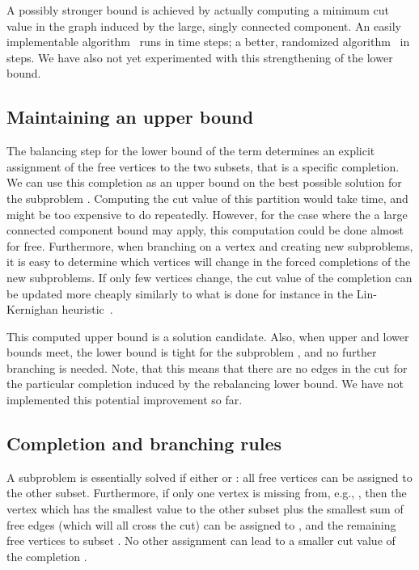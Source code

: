 \documentclass[a4paper,11pt]{article}
\begin{document}
A possibly stronger bound is achieved by actually computing a minimum
cut value in the graph induced by the large, singly connected
component. An easily implementable algorithm~\cite{StoerWagner97} runs
in  time steps; a better, randomized
algorithm~\cite{Karger00} in  steps.  We have also not
yet experimented with this strengthening of the lower bound.

\subsection{Maintaining an upper bound}

The balancing step for the lower bound of the  term determines an explicit
assignment of the free vertices to the two subsets, that is a specific
completion. We can use this completion as an upper bound on the best
possible solution for the subproblem .  Computing the cut
value of this partition would take  time, and might be too
expensive to do repeatedly.  However, for the case where the a large
connected component bound may apply, this computation could be done
almost for free. Furthermore, when branching on a vertex and creating
new subproblems, it is easy to determine which vertices will change in
the forced completions of the new subproblems. If only few vertices
change, the cut value of the completion can be updated more cheaply
similarly to what is done for instance in the Lin-Kernighan
heuristic~\cite{FiducciaMattheyses82,KernighanLin70,Traff06:kpartition}.

This computed upper bound is a solution candidate. Also, when upper and
lower bounds meet, the lower bound is tight for the subproblem
, and no further branching is needed. Note, that this means
that there are no edges in the cut  for the particular completion  induced by the
rebalancing lower bound.  We have not implemented this potential
improvement so far.

\subsection{Completion and branching rules}

A subproblem is essentially solved if either  or
: all free vertices can be assigned to the other subset.
Furthermore, if only one vertex is missing from, e.g., , then the
vertex which has the smallest  value to the other subset plus
the smallest sum of free edges (which will all cross the cut) can be
assigned to , and the remaining free vertices to subset . No
other assignment can lead to a smaller cut value of the completion
.
\end{document}

